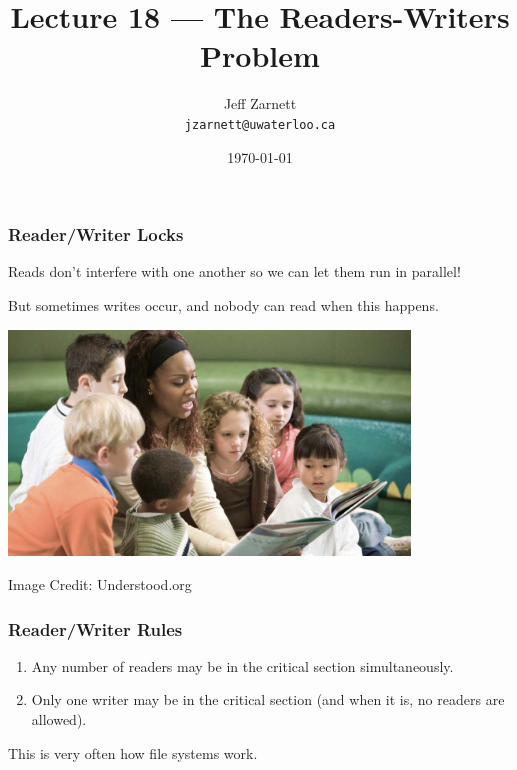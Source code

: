 
\usepackage{multirow}

\title{Lecture 18 --- The Readers-Writers Problem }

\author{Jeff Zarnett \\ \small \texttt{jzarnett@uwaterloo.ca}}
\date{\today}




\begin{frame}
	\titlepage

\end{frame}

\begin{frame}
	\frametitle{Reader/Writer Locks}
	Reads don't interfere with one another so we can let them run in parallel!

	But sometimes writes occur, and nobody can read when this happens.

	\begin{center}
		\includegraphics[width=0.8\textwidth]{images/groupreading.jpg}
	\end{center}
	\hfill Image Credit: Understood.org
\end{frame}

\begin{frame}
	\frametitle{Reader/Writer Rules}


	\begin{enumerate}
		\item Any number of readers may be in the critical section simultaneously.
		\item Only one writer may be in the critical section (and when it is, no readers are allowed).
	\end{enumerate}


	This is very often how file systems work.

\end{frame}



